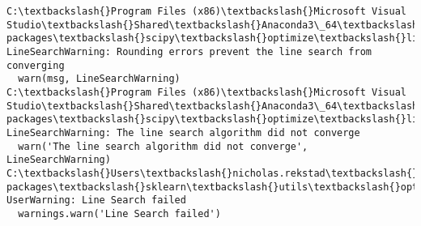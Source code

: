 \documentclass[11pt]{article}
\begin{document}
    \begin{Verbatim}[commandchars=\\\{\}]
C:\textbackslash{}Program Files (x86)\textbackslash{}Microsoft Visual Studio\textbackslash{}Shared\textbackslash{}Anaconda3\_64\textbackslash{}lib\textbackslash{}site-packages\textbackslash{}scipy\textbackslash{}optimize\textbackslash{}linesearch.py:422: LineSearchWarning: Rounding errors prevent the line search from converging
  warn(msg, LineSearchWarning)
C:\textbackslash{}Program Files (x86)\textbackslash{}Microsoft Visual Studio\textbackslash{}Shared\textbackslash{}Anaconda3\_64\textbackslash{}lib\textbackslash{}site-packages\textbackslash{}scipy\textbackslash{}optimize\textbackslash{}linesearch.py:313: LineSearchWarning: The line search algorithm did not converge
  warn('The line search algorithm did not converge', LineSearchWarning)
C:\textbackslash{}Users\textbackslash{}nicholas.rekstad\textbackslash{}AppData\textbackslash{}Roaming\textbackslash{}Python\textbackslash{}Python36\textbackslash{}site-packages\textbackslash{}sklearn\textbackslash{}utils\textbackslash{}optimize.py:195: UserWarning: Line Search failed
  warnings.warn('Line Search failed')

    \end{Verbatim}
\end{document}
